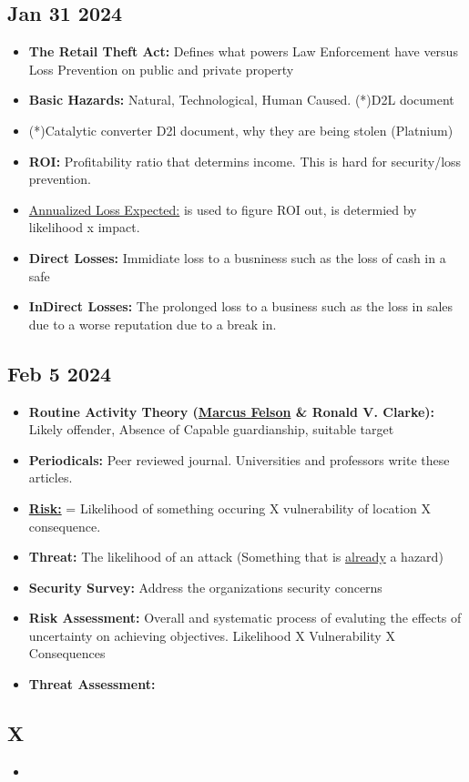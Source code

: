 \documentclass[12pt]{article}
\begin{document}
\subsection*{Jan 31 2024}

\begin{itemize}
		  \item \textbf{The Retail Theft Act:} Defines what powers Law Enforcement have versus Loss Prevention on public
					 and private property
		  \item \textbf{Basic Hazards:} Natural, Technological, Human Caused. (*)D2L document
		  \item (*)Catalytic converter D2l document, why they are being stolen (Platnium)
		  \item \textbf{ROI:} Profitability ratio that determins income. This is hard for security/loss prevention. 
		  \item \underline{Annualized Loss Expected:} is used to figure ROI out, is determied by likelihood x impact. 
		  \item \textbf{Direct Losses:} Immidiate loss to a busniness such as the loss of cash in a safe
		  \item \textbf{InDirect Losses:} The prolonged loss to a business such as the loss in sales due to a 
					 worse reputation due to a break in. 
\end{itemize}

\subsection*{Feb 5 2024}

\begin{itemize}
		  \item \textbf{Routine Activity Theory (\underline{Marcus Felson} \& Ronald V. Clarke):} 
					 Likely offender, Absence of Capable guardianship, suitable target
		  \item \textbf{Periodicals:} Peer reviewed journal. Universities and professors write these articles.
		  \item \textbf{\underline{Risk:}} = Likelihood of something occuring X vulnerability of location X 
					 consequence.
		  \item \textbf{Threat:} The likelihood of an attack (Something that is \underline{already} a hazard)
		  \item \textbf{Security Survey:} Address the organizations security concerns
		  \item \textbf{Risk Assessment:} Overall and systematic process of evaluting the effects of uncertainty
					 on achieving objectives. Likelihood X Vulnerability X Consequences
		  \item \textbf{Threat Assessment:} 
\end{itemize}

\subsection*{X}

\begin{itemize}
		  \item 
\end{itemize}
\end{document}
